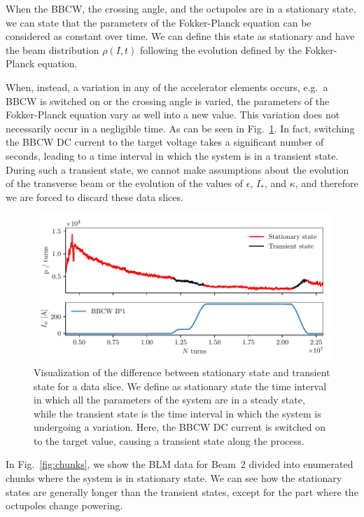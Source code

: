 When the BBCW, the crossing angle, and the octupoles are in a stationary state, we can state that the parameters of the Fokker-Planck equation can be considered as constant over time. We can define this state as stationary and have the beam distribution $\rho(I, t)$ following the evolution defined by the Fokker-Planck equation.

When, instead, a variation in any of the accelerator elements occurs, e.g.\ a BBCW is switched on or the crossing angle is varied, the parameters of the Fokker-Planck equation vary as well into a new value. This variation does not necessarily occur in a negligible time. As can be seen in Fig.~\ref{fig:transient-state}. In fact, switching the BBCW DC current to the target voltage takes a significant number of seconds, leading to a time interval in which the system is in a transient state. During such a transient state, we cannot make assumptions about the evolution of the transverse beam or the evolution of the values of $\epsilon$, $I_\ast$, and $\kappa$, and therefore we are forced to discard these data slices.

\begin{figure}[th]
    \centering
    \includegraphics[width=1.0\textwidth]{5_wire_compensators_LHC/figs/stationary_transient.pdf}
    \caption{Visualization of the difference between stationary state and transient state for a data slice. We define as stationary state the time interval in which all the parameters of the system are in a steady state, while the transient state is the time interval in which the system is undergoing a variation. Here, the BBCW DC current is switched on to the target value, causing a transient state along the process.}
    \label{fig:transient-state}
\end{figure}

In Fig.~\ref{fig:chunks}, we show the BLM data for Beam~2 divided into enumerated chunks where the system is in stationary state. We can see how the stationary states are generally longer than the transient states, except for the part where the octupoles change powering.

